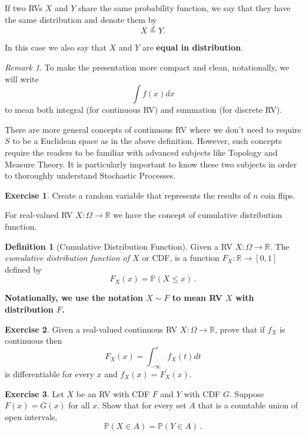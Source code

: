 \documentclass[
  openany]{book}
\theoremstyle{definition}
\newtheorem{definition}{Definition}[chapter]
\theoremstyle{definition}
\theoremstyle{definition}
\newtheorem{exercise}{Exercise}[chapter]
\theoremstyle{definition}
\theoremstyle{remark}
\newtheorem*{remark}{Remark}
\begin{document}
If two RVs \(X\) and \(Y\) share the same probability function, we say that they
have the same distribution and denote them by
\[ X \stackrel{d}{=}Y.\]

In this case we also say that \(X\) and \(Y\) are \textbf{equal in distribution}.

\begin{remark}
To make the presentation more compact and clean,
notationally, we will write
\[ \int f(x)  dx \]
to mean both integral (for continuous RV) and summation (for discrete RV).
\end{remark}

There are more general concepts of continuous RV where we don't need to require
\(S\) to be a Euclidean space as in the above definition.
However, such concepts require the readers to be familiar with advanced subjects
like Topology and Measure Theory. It is particularly important to know these two
subjects
in order to thoroughly understand Stochastic Processes.

\begin{exercise}
Create a random variable that represents the results of \(n\) coin flips.
\end{exercise}

For real-valued RV \(X:\Omega \to \mathbb{R}\) we have the concept of cumulative distribution function.

\begin{definition}[Cumulative Distribution Function]
Given a RV \(X:\Omega \to \mathbb{R}\).
The \emph{cumulative distribution function of \(X\)} or CDF, is
a function \(F_X : \mathbb{R}\to [0,1]\)
defined by
\[ F_X (x) = \mathbb{P}(X \leq x) \,. \]
\end{definition}

\textbf{Notationally, we use the notation \(X\sim F\) to mean
RV \(X\) with distribution \(F\).}

\begin{exercise}
Given a real-valued continuous RV \(X: \Omega \to \mathbb{R}\), prove that
if \(f_X\) is continuous then
\[
F_X(x)=\int_{-\infty}^x f_X(t) d t
\]
is differentiable for every \(x\)
and \(f_X(x)=F_X^{\prime}(x)\).
\end{exercise}

\begin{exercise}
Let \(X\) be an RV with CDF \(F\) and \(Y\) with CDF \(G\).
Suppose \(F(x) = G(x)\) for all \(x\). Show that for every set \(A\) that
is a countable union of open intervals,
\[ \mathbb{P}(X \in A) = \mathbb{P}(Y \in A) \,.\]
\end{exercise}
\end{document}
